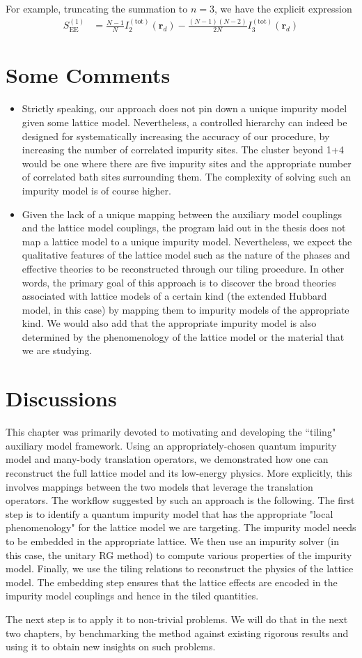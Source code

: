 For example, truncating the summation to \(n=3\), we have the explicit expression
\begin{equation}\begin{aligned}
	S_\text{EE}^{(1)} &= \frac{N-1}{N}I_2^{(\text{tot})}(\bm r_d) - \frac{(N-1)(N-2)}{2N}I_3^{(\text{tot})}(\bm r_d)
\end{aligned}\end{equation}

{\color{\hicol}
\section{Some Comments}
\begin{itemize}
	\item Strictly speaking, our approach does not pin down a unique impurity model given some lattice model. Nevertheless, a controlled hierarchy can indeed be designed for systematically increasing the accuracy of our procedure, by increasing the number of correlated impurity sites. The cluster beyond 1+4 would be one where there are five impurity sites and the appropriate number of correlated bath sites surrounding them. The complexity of solving such an impurity model is of course higher.
	\item Given the lack of a unique mapping between the auxiliary model couplings and the lattice model couplings, the program laid out in the thesis does not map a lattice model to a unique impurity model. Nevertheless, we expect the qualitative features of the lattice model such as the nature of the phases and effective theories to be reconstructed through our tiling procedure. In other words, the primary goal of this approach is to discover the broad theories associated with lattice models of a certain kind (the extended Hubbard model, in this case) by mapping them to impurity models of the appropriate kind. We would also add that the appropriate impurity model is also determined by the phenomenology of the lattice model or the material that we are studying.
\end{itemize}

}
\section{Discussions}
This chapter was primarily devoted to motivating and developing the ``tiling" auxiliary model framework. Using an appropriately-chosen quantum impurity model and many-body translation operators, we demonstrated how one can reconstruct the full lattice model and its low-energy physics. More explicitly, this involves mappings between the two models that leverage the translation operators. The workflow suggested by such an approach is the following. The first step is to identify a quantum impurity model that has the appropriate "local phenomenology" for the lattice model we are targeting. The impurity model needs to be embedded in the appropriate lattice. We then use an impurity solver (in this case, the unitary RG method) to compute various properties of the impurity model. Finally, we use the tiling relations to reconstruct the physics of the lattice model. The embedding step ensures that the lattice effects are encoded in the impurity model couplings and hence in the tiled quantities.

The next step is to apply it to non-trivial problems. We will do that in the next two chapters, by benchmarking the method against existing rigorous results and using it to obtain new insights on such problems.
